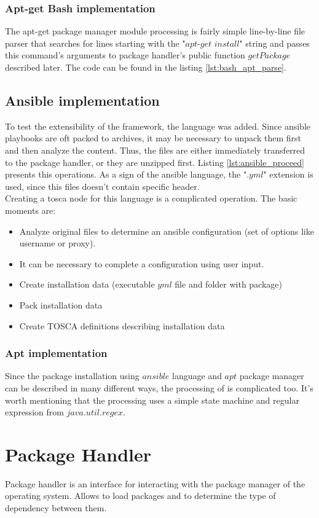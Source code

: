\subsubsection*{Apt-get Bash implementation}
The apt-get package manager module processing is fairly simple line-by-line file parser that searches for lines starting with the "$apt$-$get$ $install$" string and passes this command's arguments to package handler's public function $getPackage$ described later. 
The code can be found in the listing \ref{lst:bash_apt_parse}.
\subsection*{Ansible implementation}
To test the extensibility of the framework, the  language was added.
Since ansible playbooks are oft packed to archives, it may be necessary to unpack them first and  then analyze the content.
Thus, the files are either immediately transferred to the package handler, or they are unzipped first.
Listing \ref{lst:ansible_proceed} presents this operations.
As a sign of the ansible language, the ".$yml$" extension is used, since this files doesn't contain specific header.\\
Creating a \gls{tosca} node for this language is a complicated operation. 
The basic moments are:
\begin{itemize}
	\item Analyze original files to determine an ansible configuration (set of options like username or proxy).
	\item It can be necessary to complete a configuration using user input.
	\item Create installation data (executable $yml$ file and folder with package)
	\item Pack installation data
	\item Create TOSCA definitions describing installation data
\end{itemize} 

\subsubsection*{Apt implementation}
Since the package installation using $ansible$ language and $apt$ package manager can be described in many different ways, the processing of is complicated too.
It's worth mentioning that the processing uses a simple state machine and regular expression from $java$.$util$.$regex$.

\section{Package Handler}
Package handler is an interface for interacting with the package manager of the operating system.
Allows to load packages and to determine the type of dependency between them.


